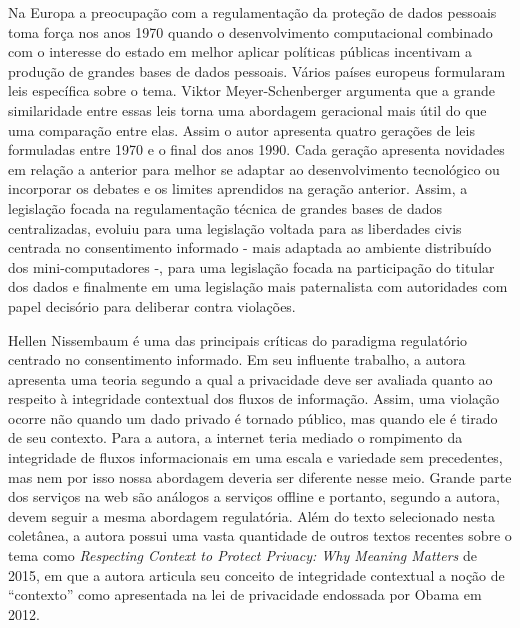 Na Europa a preocupação com a regulamentação da proteção de dados
pessoais toma força nos anos 1970 quando o desenvolvimento computacional
combinado com o interesse do estado em melhor aplicar políticas públicas
incentivam a produção de grandes bases de dados pessoais. Vários países
europeus formularam leis específica sobre o tema. Viktor
Meyer-Schenberger argumenta que a grande similaridade entre essas leis
torna uma abordagem geracional mais útil do que uma comparação entre
elas. Assim o autor apresenta quatro gerações de leis formuladas entre
1970 e o final dos anos 1990. Cada geração apresenta novidades em
relação a anterior para melhor se adaptar ao desenvolvimento tecnológico
ou incorporar os debates e os limites aprendidos na geração anterior.
Assim, a legislação focada na regulamentação técnica de grandes bases de
dados centralizadas, evoluiu para uma legislação voltada para as
liberdades civis centrada no consentimento informado - mais adaptada ao
ambiente distribuído dos mini-computadores -, para uma legislação focada
na participação do titular dos dados e finalmente em uma legislação mais
paternalista com autoridades com papel decisório para deliberar contra
violações.

Hellen Nissembaum é uma das principais críticas do paradigma regulatório
centrado no consentimento informado. Em seu influente trabalho, a autora
apresenta uma teoria segundo a qual a privacidade deve ser avaliada
quanto ao respeito à integridade contextual dos fluxos de informação.
Assim, uma violação ocorre não quando um dado privado é tornado público,
mas quando ele é tirado de seu contexto. Para a autora, a internet teria
mediado o rompimento da integridade de fluxos informacionais em uma
escala e variedade sem precedentes, mas nem por isso nossa abordagem
deveria ser diferente nesse meio. Grande parte dos serviços na web são
análogos a serviços offline e portanto, segundo a autora, devem seguir a
mesma abordagem regulatória. Além do texto selecionado nesta coletânea,
a autora possui uma vasta quantidade de outros textos recentes sobre o
tema como \emph{Respecting Context to Protect Privacy: Why Meaning
Matters} de 2015, em que a autora articula seu conceito de integridade
contextual a noção de ``contexto'' como apresentada na lei de
privacidade endossada por Obama em 2012.

